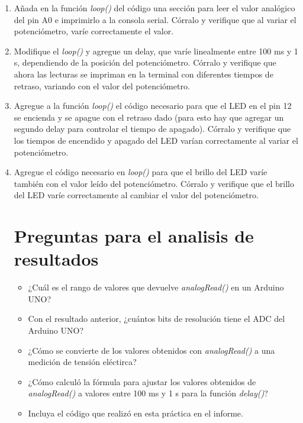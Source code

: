 \begin{enumerate}
    \item Añada en la función \textit{loop()} del código una sección para leer el valor analógico del pin A0 e imprimirlo a la consola serial. Córralo y verifique que al variar el potenciómetro, varíe correctamente el valor.
    \item Modifique el \textit{loop()} y agregue un delay, que varíe linealmente entre 100 ms y 1 s, dependiendo de la posición del potenciómetro. Córralo y verifique que ahora las lecturas se impriman en la terminal con diferentes tiempos de retraso, variando con el valor del potenciómetro.
    \item Agregue a la función \textit{loop()} el código necesario para que el LED en el pin 12 se encienda y se apague con el retraso dado (para esto hay que agregar un segundo delay para controlar el tiempo de apagado). Córralo y verifique que los tiempos de encendido y apagado del LED varían correctamente al variar el potenciómetro.
    \item Agregue el código necesario en \textit{loop()} para que el brillo del LED varíe también con el valor leído del potenciómetro. Córralo y verifique que el brillo del LED varíe correctamente al cambiar el valor del potenciómetro.


    \section{Preguntas para el analisis de resultados}
    \begin{itemize}
        \item ¿Cuál es el rango de valores que devuelve \textit{analogRead()} en un Arduino UNO?
        \item Con el resultado anterior, ¿cuántos bits de resolución tiene el ADC del Arduino UNO?
        \item ¿Cómo se convierte de los valores obtenidos con \textit{analogRead()} a una medición de tensión eléctirca?
        \item ¿Cómo calculó la fórmula para ajustar los valores obtenidos de \textit{analogRead()} a valores entre 100 ms y 1 s para la función \textit{delay()}?
        \item Incluya el código que realizó en esta práctica en el informe.
    \end{itemize}
\end{enumerate}
